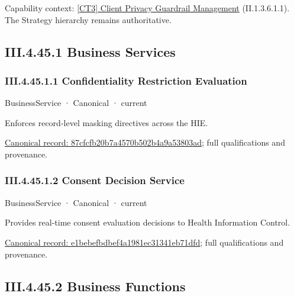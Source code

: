 {\small Capability context: \hyperref[element:7577a6e1815243648dd5356c21cca151]{[CT3] Client Privacy Guardrail Management} (II.1.3.6.1.1). The Strategy hierarchy remains authoritative.}\par
\subsection*{III.4.45.1 Business Services}
\label{navigation:III.4.45.1}

\subsubsection*{III.4.45.1.1 Confidentiality Restriction Evaluation}
\label{navigation:III.4.45.1.1}

\label{element:87cfcfb20b7a4570b502b4a9a53803ad}
{\small BusinessService · Canonical · current}\par

Enforces record-level masking directives across the HIE.


{\footnotesize \href{../../../../continuum/business/business-service/87cfcfb20b7a4570b502b4a9a53803ad.md}{Canonical record: 87cfcfb20b7a4570b502b4a9a53803ad}; full qualifications and provenance.}\par
\subsubsection*{III.4.45.1.2 Consent Decision Service}
\label{navigation:III.4.45.1.2}

\label{element:e1bebefbdbef4a1981ec31341eb71dfd}
{\small BusinessService · Canonical · current}\par

Provides real-time consent evaluation decisions to Health Information Control.


{\footnotesize \href{../../../../continuum/business/business-service/e1bebefbdbef4a1981ec31341eb71dfd.md}{Canonical record: e1bebefbdbef4a1981ec31341eb71dfd}; full qualifications and provenance.}\par
\subsection*{III.4.45.2 Business Functions}
\label{navigation:III.4.45.2}

